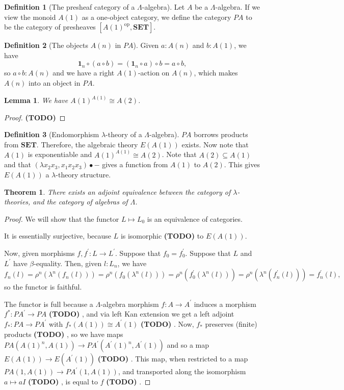 \documentclass[a4paper]{amsbook}
\newtheorem{lemma}{Lemma}
\newtheorem{theorem}{Theorem}
\theoremstyle{definition}
\newtheorem{definition}{Definition}
\theoremstyle{remark}
\newcommand{\op}[1]{\ensuremath{#1^{\text{op}}}}
\newcommand\SET{\mathbf{SET}}
\newcommand\TODO{\textbf{(TODO)} }
\begin{document}
  \begin{definition}[The presheaf category of a $ \Lambda $-algebra]
    Let $ A $ be a $ \Lambda $-algebra. If we view the monoid $ A(1) $ as a one-object category, we define the category $ PA $ to be the category of presheaves $ [\op{A(1)}, \SET] $.
  \end{definition}

  \begin{definition}[The objects $ A(n) $ in $ PA $]
    Given $ a: A(n) $ and $ b: A(1) $, we have
    \[ \mathbf 1_n \circ (a \circ b) = (\mathbf 1_n \circ a) \circ b = a \circ b, \]
    so $ a \circ b: A(n) $ and we have a right $ A(1) $-action on $ A(n) $, which makes $ A(n) $ into an object in $ PA $.
  \end{definition}

  \begin{lemma}
    We have $ A(1)^{A(1)} \cong A(2) $.
  \end{lemma}
  \begin{proof}
    \TODO
  \end{proof}

  \begin{definition}[Endomorphism $ \lambda $-theory of a $ \Lambda $-algebra]
    $ PA $ borrows products from $ \SET $. Therefore, the algebraic theory $ E(A(1)) $ exists. Now note that $ A(1) $ is exponentiable and $ A(1)^{A(1)} \cong A(2) $.
    Note that $ A(2) \subseteq A(1) $ and that $ (\lambda x_2 x_3, x_1 x_2 x_3) \bullet - $ gives a function from $ A(1) $ to $ A(2) $. This gives $ E(A(1)) $ a $ \lambda $-theory structure.
  \end{definition}

  \begin{theorem}
    There exists an adjoint equivalence between the category of $ \lambda $-theories, and the category of algebras of $ \Lambda $.
  \end{theorem}
  \begin{proof}
    We will show that the functor $ L \mapsto L_0 $ is an equivalence of categories.

    It is essentially surjective, because $ L $ is isomorphic \TODO to $ E(A(1)) $.

    Now, given morphisms $ f, f^\prime: L \to L^\prime $. Suppose that $ f_0 = f^\prime_0 $. Suppose that $ L $ and $ L^\prime $ have $ \beta $-equality. Then, given $ l: L_n $, we have
    \[ f_n(l) = \rho^n(\lambda^n(f_n(l))) = \rho^n(f_0(\lambda^n(l))) = \rho^n(f^\prime_0(\lambda^n(l))) = \rho^n(\lambda^n(f^\prime_n(l))) = f^\prime_n(l), \]
    so the functor is faithful.

    The functor is full because a $ \Lambda $-algebra morphism $ f: A \to A^\prime $ induces a morphism $ f^*: PA^\prime \to PA $ \TODO, and via left Kan extension we get a left adjoint $ f_*: PA \to PA^\prime $ with $ f_*(A(1)) \cong A^\prime(1) $ \TODO. Now, $ f_* $ preserves (finite) products \TODO, so we have maps $ PA(A(1)^n, A(1)) \to PA^\prime(A^\prime(1)^n, A^\prime(1)) $ and so a map $ E(A(1)) \to E(A^\prime(1)) $ \TODO. This map, when restricted to a map $ PA(1, A(1)) \to PA^\prime(1, A(1)) $, and transported along the isomorphism $ a \mapsto a I $ \TODO, is equal to $ f $ \TODO.
  \end{proof}
\end{document}
